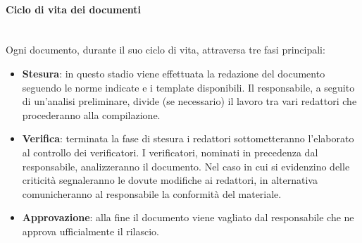         \paragraph{Ciclo di vita dei documenti}\mbox{}\\ [1mm]
            Ogni documento, durante il suo ciclo di vita, attraversa tre fasi principali:
            \begin{itemize}
                \item \textbf{Stesura}: in questo stadio viene effettuata la redazione del documento seguendo le norme indicate e i template disponibili.
                                        Il responsabile, a seguito di un'analisi preliminare, divide (se necessario) il lavoro tra vari redattori che procederanno
                                        alla compilazione.
                \item \textbf{Verifica}: terminata la fase di stesura i redattori sottometteranno l'elaborato al controllo dei verificatori. I verificatori, 
                                         nominati in precedenza dal responsabile, analizzeranno il documento. Nel caso in cui si evidenzino delle criticità
                                         segnaleranno le dovute modifiche ai redattori, in alternativa comunicheranno al responsabile la conformità del materiale.
                \item \textbf{Approvazione}: alla fine il documento viene vagliato dal responsabile che ne approva ufficialmente il rilascio.
            \end{itemize}
